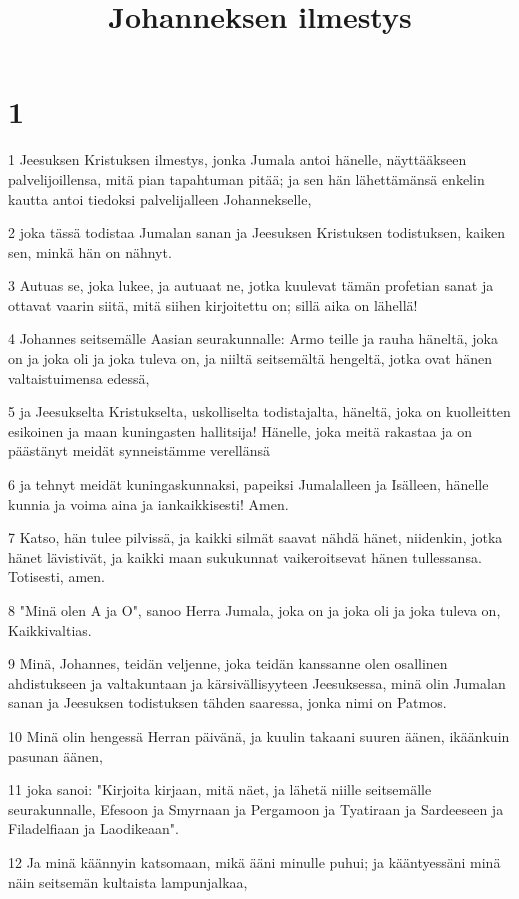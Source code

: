 

\title{Johanneksen ilmestys}


\chapter{1}

\par 1 Jeesuksen Kristuksen ilmestys, jonka Jumala antoi hänelle, näyttääkseen palvelijoillensa, mitä pian tapahtuman pitää; ja sen hän lähettämänsä enkelin kautta antoi tiedoksi palvelijalleen Johannekselle,
\par 2 joka tässä todistaa Jumalan sanan ja Jeesuksen Kristuksen todistuksen, kaiken sen, minkä hän on nähnyt.
\par 3 Autuas se, joka lukee, ja autuaat ne, jotka kuulevat tämän profetian sanat ja ottavat vaarin siitä, mitä siihen kirjoitettu on; sillä aika on lähellä!
\par 4 Johannes seitsemälle Aasian seurakunnalle: Armo teille ja rauha häneltä, joka on ja joka oli ja joka tuleva on, ja niiltä seitsemältä hengeltä, jotka ovat hänen valtaistuimensa edessä,
\par 5 ja Jeesukselta Kristukselta, uskolliselta todistajalta, häneltä, joka on kuolleitten esikoinen ja maan kuningasten hallitsija! Hänelle, joka meitä rakastaa ja on päästänyt meidät synneistämme verellänsä
\par 6 ja tehnyt meidät kuningaskunnaksi, papeiksi Jumalalleen ja Isälleen, hänelle kunnia ja voima aina ja iankaikkisesti! Amen.
\par 7 Katso, hän tulee pilvissä, ja kaikki silmät saavat nähdä hänet, niidenkin, jotka hänet lävistivät, ja kaikki maan sukukunnat vaikeroitsevat hänen tullessansa. Totisesti, amen.
\par 8 "Minä olen A ja O", sanoo Herra Jumala, joka on ja joka oli ja joka tuleva on, Kaikkivaltias.
\par 9 Minä, Johannes, teidän veljenne, joka teidän kanssanne olen osallinen ahdistukseen ja valtakuntaan ja kärsivällisyyteen Jeesuksessa, minä olin Jumalan sanan ja Jeesuksen todistuksen tähden saaressa, jonka nimi on Patmos.
\par 10 Minä olin hengessä Herran päivänä, ja kuulin takaani suuren äänen, ikäänkuin pasunan äänen,
\par 11 joka sanoi: "Kirjoita kirjaan, mitä näet, ja lähetä niille seitsemälle seurakunnalle, Efesoon ja Smyrnaan ja Pergamoon ja Tyatiraan ja Sardeeseen ja Filadelfiaan ja Laodikeaan".
\par 12 Ja minä käännyin katsomaan, mikä ääni minulle puhui; ja kääntyessäni minä näin seitsemän kultaista lampunjalkaa,
